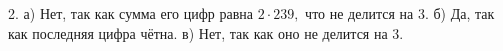 2. а) Нет, так как сумма его цифр равна $2\cdot239,$ что не делится на 3. б) Да, так как последняя цифра чётна. в) Нет, так как оно не делится на 3.\\
